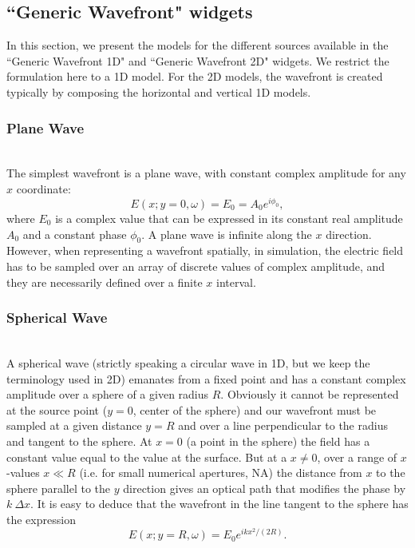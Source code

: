 \documentclass{iopconfser}
\begin{document}
\subsection{``Generic Wavefront" widgets}

In this section, we present the models for the different sources available in the ``Generic Wavefront 1D" and ``Generic Wavefront 2D" widgets. 
We restrict the formulation here to a 1D model. For the 2D models, the wavefront is created typically by composing the horizontal and vertical 1D models.  

\subsubsection{Plane Wave}\hspace*{\fill} \\
The simplest wavefront is a plane wave, with constant complex amplitude for any $x$ coordinate: 
\begin{equation}
   E(x;y=0,\omega)=E_0=A_0 e^{i \phi_0},
\end{equation}
where $E_0$ is a complex value that can be expressed in its constant real amplitude $A_0$ and a constant phase $\phi_0$. A plane wave is infinite along the $x$ direction. However, when representing a wavefront spatially, in simulation, the electric field has to be sampled over an array of discrete values of complex amplitude, and they are necessarily defined over a finite $x$ interval. 

\subsubsection{Spherical Wave}\hspace*{\fill} \\
A spherical wave (strictly speaking a circular wave in 1D, but we keep the terminology used in 2D) emanates from a fixed point and has a constant complex amplitude over a sphere of a given radius $R$. Obviously it cannot be represented at the source point ($y=0$, center of the sphere) and our wavefront must be sampled at a given distance $y=R$ and over a line perpendicular to the radius and tangent to the sphere. At $x=0$ (a point in the sphere) the field has a constant value equal to the value at the surface. But at a $x{\ne}0$, over a range of $x$-values $x{\ll}R$ (i.e. for small numerical apertures, NA) the distance from $x$ to the sphere parallel to the $y$ direction gives an optical path that modifies the phase by $k ~\Delta x$. It is easy to deduce that the wavefront in the line tangent to the sphere has the expression
\begin{equation}
\label{eq:sphericalWave}
    E(x;y=R,\omega)  = E_0 e^{i k x^2 / (2 R)}.
\end{equation}
\end{document}
